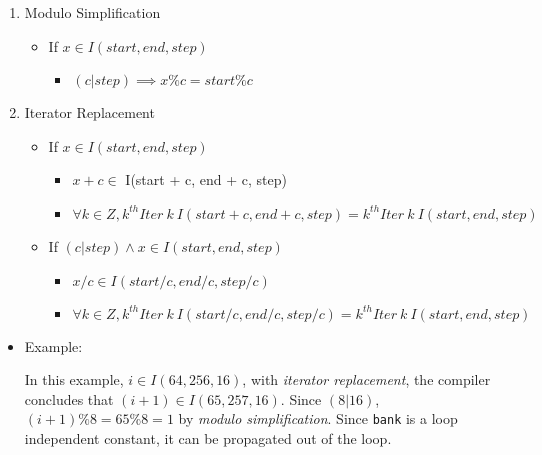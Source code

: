\begin{enumerate}
\def\labelenumi{\arabic{enumi}.}
\tightlist
\item
  Modulo Simplification

  \begin{itemize}
  \tightlist
  \item
    If \(x \in I(start, end, step)\)

    \begin{itemize}
    \tightlist
    \item
      \((c | step) \implies x \% c = start \% c\)
    \end{itemize}
  \end{itemize}
\item
  Iterator Replacement

  \begin{itemize}
  \tightlist
  \item
    If \(x \in I(start, end, step)\)

    \begin{itemize}
    \tightlist
    \item
      \(x + c \in\) I(start + c, end + c, step)
    \item
      \(\forall k \in Z, k^{th}Iter ~k~ I(start + c, end + c, step) = k^{th}Iter ~k~ I(start, end, step)\)
    \end{itemize}
  \item
    If \((c | step) \wedge x \in I(start, end, step)\)

    \begin{itemize}
    \tightlist
    \item
      \(x / c \in I(start/c, end/c, step/c)\)
    \item
      \(\forall k \in Z, k^{th}Iter ~k~ I(start/c, end/c, step/c) = k^{th}Iter ~k~ I(start, end, step)\)
    \end{itemize}
  \end{itemize}
\end{enumerate}

\begin{itemize}
\item
  Example:

\begin{Shaded}
\begin{Highlighting}[]
   \OperatorTok{(}\OperatorTok{=} \OperatorTok{;}\OperatorTok{\textless{}=} \OperatorTok{;}\OperatorTok{+=} \OperatorTok{)} \OperatorTok{\{}
\OperatorTok{=} \OperatorTok{(}\OperatorTok{+} \OperatorTok{)} \OperatorTok{\%} \OperatorTok{;}
  \OperatorTok{\}}
\end{Highlighting}
\end{Shaded}

  In this example, \(i \in I(64, 256, 16)\), with \emph{iterator
  replacement}, the compiler concludes that
  \((i+1) \in I(65, 257, 16)\). Since \((8 | 16)\),
  \((i + 1) \% 8 = 65 \% 8 = 1\) by \emph{modulo simplification}. Since
  \texttt{bank} is a loop independent constant, it can be propagated out
  of the loop.
\end{itemize}

